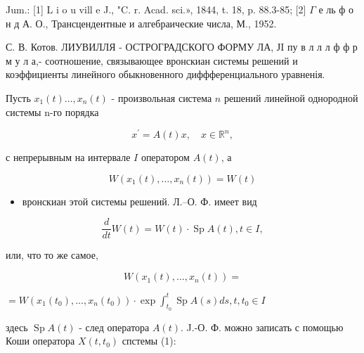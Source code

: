 \documentclass[10pt]{article}
\begin{document}
Jum.: [1] L i o u vill e J., "C. r. Acad. sci.», 1844, t. 18, p. 88.3-85; [2] $\Gamma$ е ль ф о н д А. О., Трансцендентные и алгебраические числа, М., 1952.

С. В. Котов. ЛИУВИЛЛЯ - ОСТРОГРАДСКОГО ФОРМУ ЛА, ЈI пу в л л л ф ф р м у л а,- соотношение, связывающее вронскиан системы решений и коэффициенты линейного обыкновенного диффференциального уравненія.



Пусть $x_{1}(t) \ldots, x_{n}(t)$ - произвольная система $n$ решений линейной однородной системы n-го порядка



\[

x^{\prime}=A(t) x, \quad x \in \mathbb{R}^{n},

\]



с непрерывным на интервале $I$ оператором $A(t)$, а



\[

W\left(x_{1}(t), \ldots, x_{n}(t)\right)=W(t)

\]



\begin{itemize}

  \item вронскиан этой системы решений. Л.--О. Ф. имеет вид

\end{itemize}



\[

\frac{d}{d t} W(t)=W(t) \cdot \operatorname{Sp} A(t), t \in I,

\]



или, что то же самое,



\[

W\left(x_{1}(t), \ldots, x_{n}(t)\right)=

\]



$=W\left(x_{1}\left(t_{0}\right), \ldots, x_{n}\left(t_{0}\right)\right) \cdot \exp \int_{t_{0}}^{t} \operatorname{Sp} A(s) d s, t, t_{0} \in I$



здесь $\operatorname{Sp} A(t)$ - след оператора $A(t)$. J.-О. Ф. можно записать с помощью Коши оператора $X\left(t, t_{0}\right)$ спстемы (1):
\end{document}
